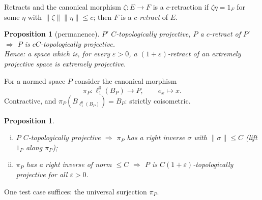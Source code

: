 \documentclass[10pt,aspectratio=169]{beamer}
\newtheorem{proposition}[theorem]{Proposition}
\newcommand{\lo}[1]{\ell_1^0(#1)}
\begin{document}
\begin{frame}{Retracts and the canonical morphism}
  $\zeta\colon E\to F$ is a \alert{$c$-retraction} if $\zeta\eta=1_F$ for some
  $\eta$ with $\|\zeta\|\|\eta\|\le c$; then $F$ is a \emph{$c$-retract} of $E$.
  \begin{proposition}[permanence]
    $P'$ $C$-topologically projective, $P$ a $c$-retract of $P'$
    $\Rightarrow$ $P$ is $cC$-topologically projective. \\
    Hence: a space which is, for every $\varepsilon>0$, a $(1+\varepsilon)$-retract
    of an extremely projective space is extremely projective.
  \end{proposition}
  \medskip
  For a normed space $P$ consider the \alert{canonical morphism}
  \[
    \pi_P\colon\lo{B_P}\to P,\qquad e_x\mapsto x .
  \]
  Contractive, and $\pi_P(B_{\lo{B_P}})=B_P$: strictly coisometric.
  \begin{proposition}
    \begin{enumerate}[(i)]
      \item $P$ $C$-topologically projective $\Rightarrow$ $\pi_P$ has a right
        inverse $\sigma$ with $\|\sigma\|\le C$ (lift $1_P$ along $\pi_P$);
      \item $\pi_P$ has a right inverse of norm $\le C$ $\Rightarrow$ $P$ is
        $C(1+\varepsilon)$-topologically projective for all $\varepsilon>0$.
    \end{enumerate}
  \end{proposition}
  One test case suffices: the universal surjection $\pi_P$.
\end{frame}
\end{document}
